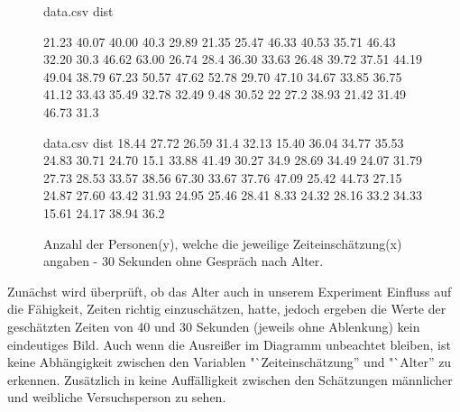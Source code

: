 \documentclass{Paper}
\begin{document}
\begin{figure}[H]
\begin{filecontents}{data.csv}
dist

21.23
40.07
40.00
40.3
29.89
21.35
25.47
 46.33
  40.53
 35.71
 46.43
32.20
 30.3
 46.62
 63.00
 26.74
 28.4
 36.30
 33.63
 26.48
 39.72
37.51
 44.19
 49.04
38.79
 67.23
 50.57
47.62
52.78
 29.70
 47.10
 34.67
33.85
36.75
 41.12
 33.43
 35.49
 32.78
 32.49
 9.48
 30.52
 22
  27.2
 38.93
 21.42
 31.49
46.73
 31.3
\end{filecontents}
\begin{minipage}[t]{0.49\linewidth}
\caption{Anzahl der Personen(y), welche die jeweilige Zeiteinschätzung(x) angaben - 40 Sekunden ohne Gespräch nach Alter.}
\label{HistZeit40sek}
\end{minipage}
\hfill
\begin{filecontents}{data.csv}
dist
 18.44
 27.72
 26.59
 31.4
 32.13
 15.40
 36.04
 34.77
 35.53
 24.83
 30.71
 24.70
 15.1
 33.88
 41.49
 30.27
 34.9
 28.69
 34.49
 24.07
 31.79
 27.73
 28.53
 33.57
 38.56
 67.30
 33.67
 37.76
 47.09
25.42
44.73
 27.15
 24.87
 27.60
 43.42
 31.93
 24.95
 25.46
 28.41
 8.33
 24.32
 28.16
 33.2
 34.33
 15.61
 24.17
38.94
 36.2
\end{filecontents}
\begin{minipage}[t]{0.49\linewidth}
\caption{Anzahl der Personen(y), welche die jeweilige Zeiteinschätzung(x) angaben - 30 Sekunden ohne Gespräch nach Alter.}
\label{HistZeit30sek}
\end{minipage}
\end{figure}


Zunächst wird überprüft, ob das Alter auch in unserem Experiment Einfluss auf die Fähigkeit, Zeiten richtig einzuschätzen, hatte, jedoch ergeben die Werte der geschätzten Zeiten von 40 und 30 Sekunden (jeweils ohne Ablenkung) kein eindeutiges Bild. Auch wenn die Ausreißer im Diagramm unbeachtet bleiben, ist keine Abhängigkeit zwischen den Variablen "`Zeiteinschätzung'' und "`Alter'' zu erkennen. Zusätzlich in keine Auffälligkeit zwischen den Schätzungen männlicher und weibliche Versuchsperson zu sehen.
\end{document}
